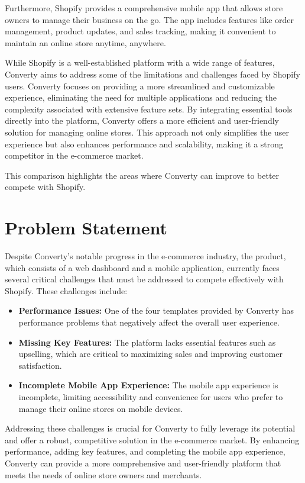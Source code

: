 Furthermore, Shopify provides a comprehensive mobile app that allows store owners to manage their business on the go. The app includes features like order management, product updates, and sales tracking, making it convenient to maintain an online store anytime, anywhere.
\newline

While Shopify is a well-established platform with a wide range of features, Converty aims to address some of the limitations and challenges faced by Shopify users. Converty focuses on providing a more streamlined and customizable experience, eliminating the need for multiple applications and reducing the complexity associated with extensive feature sets. By integrating essential tools directly into the platform, Converty offers a more efficient and user-friendly solution for managing online stores. This approach not only simplifies the user experience but also enhances performance and scalability, making it a strong competitor in the e-commerce market.

This comparison highlights the areas where Converty can improve to better compete with Shopify.

\section{Problem Statement} 
Despite Converty's notable progress in the e-commerce industry, the product, which consists of a web dashboard and a mobile application, currently faces several critical challenges that must be addressed to compete effectively with Shopify. These challenges include:

\begin{itemize} 
    \item \textbf{Performance Issues:} One of the four templates provided by Converty has performance problems that negatively affect the overall user experience. 
    \item \textbf{Missing Key Features:} The platform lacks essential features such as upselling, which are critical to maximizing sales and improving customer satisfaction. 
    \item \textbf{Incomplete Mobile App Experience:} The mobile app experience is incomplete, limiting accessibility and convenience for users who prefer to manage their online stores on mobile devices. 
\end{itemize} 

Addressing these challenges is crucial for Converty to fully leverage its potential and offer a robust, competitive solution in the e-commerce market. By enhancing performance, adding key features, and completing the mobile app experience, Converty can provide a more comprehensive and user-friendly platform that meets the needs of online store owners and merchants.

